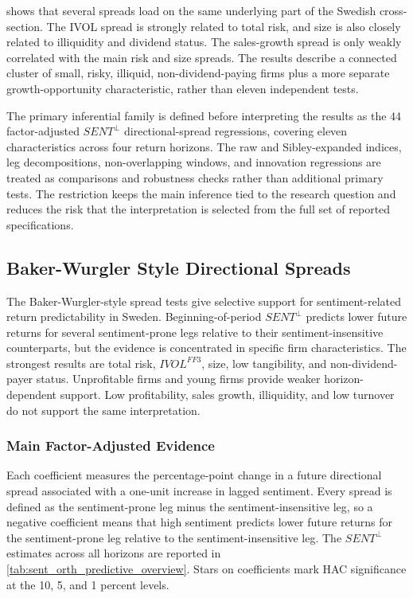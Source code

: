 \documentclass[11pt]{article}
\newcommand{\var}[1]{\ensuremath{#1}}
\begin{document}
 shows that several spreads load on the same underlying part of the Swedish cross-section. The IVOL spread is strongly related to total risk, and size is also closely related to illiquidity and dividend status. The sales-growth spread is only weakly correlated with the main risk and size spreads. The results describe a connected cluster of small, risky, illiquid, non-dividend-paying firms plus a more separate growth-opportunity characteristic, rather than eleven independent tests.

The primary inferential family is defined before interpreting the results as the 44 factor-adjusted \var{SENT^{\perp}} directional-spread regressions, covering eleven characteristics across four return horizons. The raw and Sibley-expanded indices, leg decompositions, non-overlapping windows, and innovation regressions are treated as comparisons and robustness checks rather than additional primary tests. The restriction keeps the main inference tied to the research question and reduces the risk that the interpretation is selected from the full set of reported specifications.

\subsection{Baker-Wurgler Style Directional Spreads}
The Baker-Wurgler-style spread tests give selective support for sentiment-related return predictability in Sweden. Beginning-of-period \var{SENT^{\perp}} predicts lower future returns for several sentiment-prone legs relative to their sentiment-insensitive counterparts, but the evidence is concentrated in specific firm characteristics. The strongest results are total risk, \var{IVOL^{FF3}}, size, low tangibility, and non-dividend-payer status. Unprofitable firms and young firms provide weaker horizon-dependent support. Low profitability, sales growth, illiquidity, and low turnover do not support the same interpretation.

\subsubsection{Main Factor-Adjusted Evidence}
Each coefficient measures the percentage-point change in a future directional spread associated with a one-unit increase in lagged sentiment. Every spread is defined as the sentiment-prone leg minus the sentiment-insensitive leg, so a negative coefficient means that high sentiment predicts lower future returns for the sentiment-prone leg relative to the sentiment-insensitive leg. The \var{SENT^{\perp}} estimates across all horizons are reported in \cref{tab:sent_orth_predictive_overview}. Stars on coefficients mark HAC significance at the 10, 5, and 1 percent levels.
\end{document}
